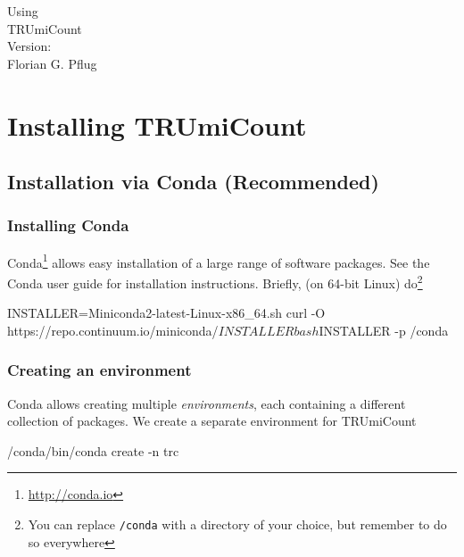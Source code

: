 \documentclass[10pt]{article}
\makeatletter
\newenvironment{shellcode}%
   {\bgroup\topsep=0pt\partopsep=0pt\shaded\verbatim}%
   {\endverbatim\endshaded\egroup}
\newcommand{\@version}{}
\newcommand{\printversion}{\@version}
\makeatother
\begin{document}
\begin{titlepage}
\vfill
{\Huge\centering%
Using\\
TRUmiCount\\}
\vskip1cm
{\large\centering%
Version: \printversion\\}
\vskip4cm
{\large\centering%
Florian G. Pflug\\}
\vfill
\tableofcontents
\vfill
\end{titlepage}



\newpage
\section{Installing TRUmiCount}

\subsection{Installation via Conda (Recommended)}

\subsubsection*{Installing Conda}

Conda\footnote{\url{http://conda.io}} allows easy installation of a large range of software packages. See the Conda user guide for installation instructions. Briefly, (on 64-bit Linux) do\footnote{You can replace \texttt{/conda} with a directory of your choice, but remember to do so everywhere}

\begin{shellcode}
INSTALLER=Miniconda2-latest-Linux-x86_64.sh
curl -O https://repo.continuum.io/miniconda/$INSTALLER
bash $INSTALLER -p /conda
\end{shellcode}

\subsubsection*{Creating an environment}

Conda allows creating multiple \emph{environments}, each containing a different collection of packages. We create a separate environment for TRUmiCount

\begin{shellcode}
/conda/bin/conda create -n trc
\end{shellcode}
\end{document}
